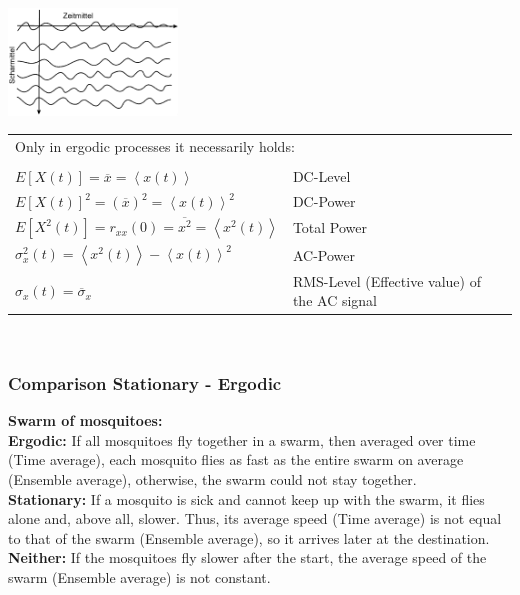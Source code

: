 			\begin{minipage}{5cm}
				\includegraphics[width=4.5cm]{bilder/zeit-scharmittel.png}
			\end{minipage}
			\begin{minipage}{13.5cm}
		
			\begin{tabular}{ll}
				\multicolumn{2}{l}{Only in ergodic processes it necessarily holds:} \\ \\
			  $E[X(t)] = \overline{x} = \left\langle x(t) \right\rangle$ & DC-Level \\
			  $E[X(t)]^{2} = (\overline{x})^{2} = \left\langle x(t) \right\rangle^{2}$ & DC-Power \\
			  $E[X^{2}(t)] = r_{xx}(0) = \overline{x^{2}} = 
							 \left\langle x^{2}(t) \right\rangle $ & Total Power \\
			  $\sigma_{x}^{2}(t) = \left\langle x^{2}(t) \right\rangle 
								   - \left\langle x(t) \right\rangle^{2}$ & AC-Power \\
			  $\sigma_{x}(t) = \overline{\sigma}_{x}$ & RMS-Level (Effective value) of the AC signal\\
			\end{tabular} \\
			\end{minipage}
		
		
		\subsubsection{Comparison Stationary - Ergodic}
		\textbf{Swarm of mosquitoes:}\\
		\textbf{Ergodic:} If all mosquitoes fly together in a swarm, then averaged over time (Time average), each mosquito flies as fast as the entire swarm on average (Ensemble average), otherwise, the swarm could not stay together. \\
		\textbf{Stationary:} If a mosquito is sick and cannot keep up with the swarm, it flies alone and, above all, slower. Thus, its average speed (Time average) is not equal to that of the swarm (Ensemble average), so it arrives later at the destination. \\
		\textbf{Neither:} If the mosquitoes fly slower after the start, the average speed of the swarm (Ensemble average) is not constant.
		
